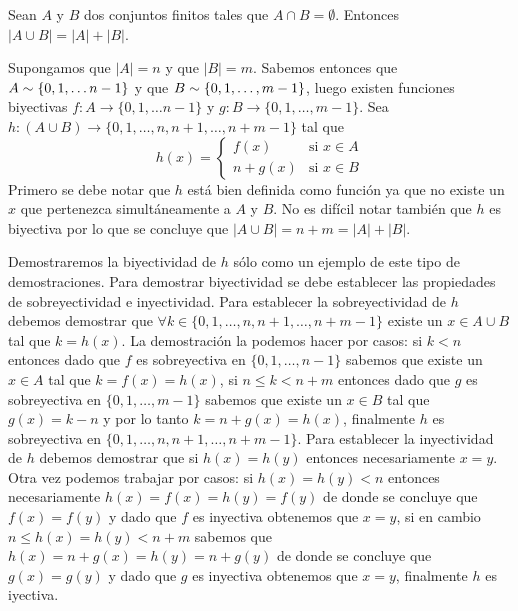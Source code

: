 \begin{lema}
Sean $A$ y $B$ dos conjuntos finitos tales que $A\cap B=\emptyset$.
Entonces $|A\cup B|=|A|+|B|$.

\begin{demostracion}
Supongamos que $|A|=n$ y que $|B|=m$.
Sabemos entonces que $A\sim\{0,1,\ldots n-1\}$ y que $B\sim\{0,1,\ldots,m-1\}$, luego existen funciones biyectivas $f:A\rightarrow\{0,1,\ldots n-1\}$ y $g:B\rightarrow\{0,1,\ldots,m-1\}$.
Sea $h:(A\cup B)\rightarrow\{0,1,\ldots,n,n+1,\ldots,n+m-1\}$ tal que
\[
h(x)=\left\{\begin{array}{lr}
			f(x)&\text{si }x\in A \\
			n+g(x)&\text{si }x\in B
			\end{array}\right.
\]
Primero se debe notar que $h$ está bien definida como función ya que no existe un $x$ que pertenezca simultáneamente a $A$ y $B$.
No es difícil notar también que $h$ es biyectiva por lo que se concluye que $|A\cup B|=n+m=|A|+|B|$.

Demostraremos la biyectividad de $h$ sólo como un ejemplo de este tipo de demostraciones.
Para demostrar biyectividad se debe establecer las propiedades de sobreyectividad e inyectividad.
Para establecer la sobreyectividad de $h$ debemos demostrar que $\forall k\in\{0,1,\ldots,n,n+1,\ldots,n+m-1\}$ existe un $x\in A\cup B$ tal que $k=h(x)$.
La demostración la podemos hacer por casos: si $k<n$ entonces dado que $f$ es sobreyectiva en $\{0,1,\ldots,n-1\}$ sabemos que existe un $x\in A$ tal que $k=f(x)=h(x)$, si $n\leq k<n+m$ entonces dado que $g$ es sobreyectiva en $\{0,1,\ldots,m-1\}$ sabemos que existe un $x\in B$ tal que $g(x)=k-n$ y por lo tanto $k=n+g(x)=h(x)$, finalmente $h$ es sobreyectiva en $\{0,1,\ldots,n,n+1,\ldots,n+m-1\}$.
Para establecer la inyectividad de $h$ debemos demostrar que si $h(x)=h(y)$ entonces necesariamente $x=y$.
Otra vez podemos trabajar por casos: si $h(x)=h(y)<n$ entonces necesariamente $h(x)=f(x)=h(y)=f(y)$ de donde se concluye que $f(x)=f(y)$ y dado que $f$ es inyectiva obtenemos que $x=y$, si en cambio $n\leq h(x)=h(y)<n+m$ sabemos que $h(x)=n+g(x)=h(y)=n+g(y)$ de donde se concluye que $g(x)=g(y)$ y dado que $g$ es inyectiva obtenemos que $x=y$, finalmente $h$ es iyectiva.
\end{demostracion}
\end{lema}

